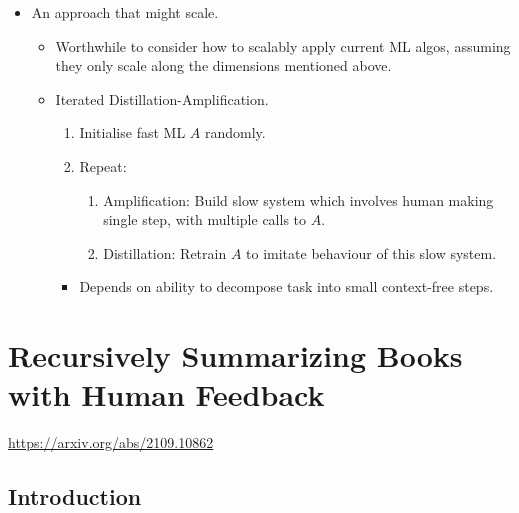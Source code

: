 \begin{itemize}
\begin{itemize}
\begin{itemize}
\begin{itemize}
            \end{itemize}
        \end{itemize}
        \item An approach that might scale.
        \begin{itemize}
            \item Worthwhile to consider how to scalably apply current ML algos, assuming they only scale along the dimensions mentioned above.
            \item Iterated Distillation-Amplification.
            \begin{enumerate}[label=\arabic*.]
                \item Initialise fast ML $A$ randomly.
                \item Repeat:
                \begin{enumerate}[label=\alph*.]
                    \item Amplification: Build slow system which involves human making single step, with multiple calls to $A$.
                    \item Distillation: Retrain $A$ to imitate behaviour of this slow system.
                \end{enumerate}
            \end{enumerate}
            \begin{itemize}
                \item Depends on ability to decompose task into small context-free steps.
            \end{itemize}
        \end{itemize}
    \end{itemize}
\end{itemize}


\section{Recursively Summarizing Books with Human Feedback}

\url{https://arxiv.org/abs/2109.10862}


\subsection{Introduction}

